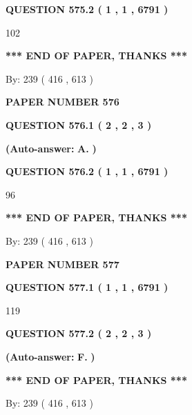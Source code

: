 \documentclass{ctexart}
\begin{document}
  
{\textbf{\large{QUESTION
575.2 
 ( 1 , 1 , 6791 )
}}}

102
   
   
   
   
\vspace{1.0in} 
{\textbf{\large{ *** END OF PAPER, THANKS *** }}} 
   
   
\hspace{1.0in} By: 
 239 ( 416 ,  613 )
   
   
   
   
\newpage 
\setcounter{page}{ 
   576001 } 
   
   
 {\textbf{ \Large{ PAPER NUMBER  576  }}}
   
   
   
   
  
  
{\textbf{\large{QUESTION
576.1 
 ( 2 , 2 , 3 )
}}}
 
 
{\textbf{(Auto-answer:}}
{\textbf{\large{
A.}}}
{\textbf{)}}
 
 
  
  
{\textbf{\large{QUESTION
576.2 
 ( 1 , 1 , 6791 )
}}}

96
   
   
   
   
\vspace{1.0in} 
{\textbf{\large{ *** END OF PAPER, THANKS *** }}} 
   
   
\hspace{1.0in} By: 
 239 ( 416 ,  613 )
   
   
   
   
\newpage 
\setcounter{page}{ 
   577001 } 
   
   
 {\textbf{ \Large{ PAPER NUMBER  577  }}}
   
   
   
   
  
  
{\textbf{\large{QUESTION
577.1 
 ( 1 , 1 , 6791 )
}}}

119
  
  
{\textbf{\large{QUESTION
577.2 
 ( 2 , 2 , 3 )
}}}
 
 
{\textbf{(Auto-answer:}}
{\textbf{\large{
F.}}}
{\textbf{)}}
 
 
   
   
   
   
\vspace{1.0in} 
{\textbf{\large{ *** END OF PAPER, THANKS *** }}} 
   
   
\hspace{1.0in} By: 
 239 ( 416 ,  613 )
   
   
   
\end{document}
